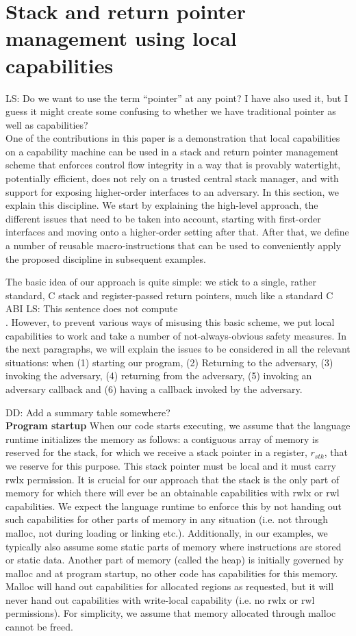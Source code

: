 \documentclass[compsoc,conference,letterpaper,fleqn]{IEEEtran}
\newcommand\lau[1]{{\color{purple} \sf \footnotesize {LS: #1}}\\}
\newcommand\dominique[1]{{\color{purple} \sf \footnotesize {DD: #1}}\\}
\newcommand{\var}[1]{\mathit{#1}}
\newcommand{\stk}{\var{stk}}
\newcommand{\plainperm}[1]{\mathrm{#1}}
\newcommand{\readwritel}{\plainperm{rwl}}
\newcommand{\rwl}{\readwritel}
\newcommand{\rwlx}{\plainperm{rwlx}}
\begin{document}
\section{Stack and return pointer management using local capabilities}
\label{sec:stack-and-return-pointer}
\lau{Do we want to use the term ``pointer'' at any point? I have also used it, but I guess it might create some confusing to whether we have traditional pointer as well as capabilities?}
One of the contributions in this paper is a demonstration that local
capabilities on a capability machine can be used in a stack and return pointer
management scheme that enforces control flow integrity in a way that is provably
watertight, potentially efficient, does not rely on a trusted central stack
manager, and with support for exposing higher-order interfaces to an adversary.
In this section, we explain this discipline. We start by explaining the
high-level approach, the different issues that need to be taken into account,
starting with first-order interfaces and moving onto a higher-order setting
after that. After that, we define a number of reusable macro-instructions that
can be used to conveniently apply the proposed discipline in subsequent
examples.

The basic idea of our approach is quite simple: we stick to a single, rather
standard, C stack and register-passed return pointers, much like a standard C
ABI\lau{This sentence does not compute}. However, to prevent various ways of
misusing this basic scheme, we put local capabilities to work and take a number
of not-always-obvious safety measures. In the next paragraphs, we will explain
the issues to be considered in all the relevant situations: when (1) starting
our program, (2) Returning to the adversary, (3) invoking the adversary, (4)
returning from the adversary, (5) invoking an adversary callback and (6) having
a callback invoked by the adversary.

\dominique{Add a summary table somewhere?}

\textbf{Program startup}
When our code starts executing, we assume that the language runtime initializes
the memory as follows: a contiguous array of memory is reserved for the stack,
for which we receive a stack pointer in a register, $r_\stk$, that we reserve for this
purpose. This stack pointer must be local and it must carry $\rwlx$ permission. It is crucial for
our approach that the stack is the only part of memory for which there will ever
be an obtainable capabilities with $\rwlx$ or $\rwl$ capabilities. We expect the language
runtime to enforce this by not handing out such capabilities for other parts of
memory in any situation (i.e. not through malloc, not during loading or linking
etc.). Additionally, in our examples, we typically also assume some static parts
of memory where instructions are stored or static data. Another part of memory
(called the heap) is initially governed by malloc and at program startup, no
other code has capabilities for this memory. Malloc will hand out capabilities
for allocated regions as requested, but it will never hand out capabilities with
write-local capability (i.e. no $\rwlx$ or $\rwl$ permissions). For simplicity,
we assume that memory allocated through malloc cannot be freed.
\end{document}
